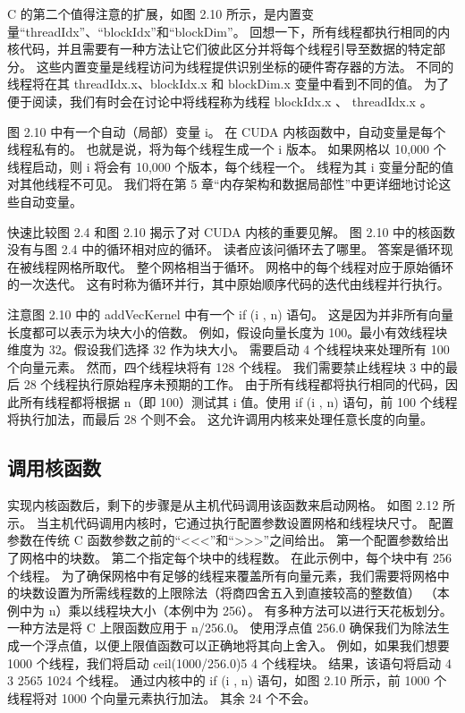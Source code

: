 C 的第二个值得注意的扩展，如图 2.10 所示，是内置变量“threadIdx”、“blockIdx”和“blockDim”。 回想一下，所有线程都执行相同的内核代码，并且需要有一种方法让它们彼此区分并将每个线程引导至数据的特定部分。 这些内置变量是线程访问为线程提供识别坐标的硬件寄存器的方法。 不同的线程将在其 threadIdx.x、blockIdx.x 和 blockDim.x 变量中看到不同的值。 为了便于阅读，我们有时会在讨论中将线程称为线程 blockIdx.x 、 threadIdx.x 。

图 2.10 中有一个自动（局部）变量 i。 在 CUDA 内核函数中，自动变量是每个线程私有的。 也就是说，将为每个线程生成一个 i 版本。 如果网格以 10,000 个线程启动，则 i 将会有 10,000 个版本，每个线程一个。 线程为其 i 变量分配的值对其他线程不可见。 我们将在第 5 章“内存架构和数据局部性”中更详细地讨论这些自动变量。

快速比较图 2.4 和图 2.10 揭示了对 CUDA 内核的重要见解。 图 2.10 中的核函数没有与图 2.4 中的循环相对应的循环。 读者应该问循环去了哪里。 答案是循环现在被线程网格所取代。 整个网格相当于循环。 网格中的每个线程对应于原始循环的一次迭代。 这有时称为循环并行，其中原始顺序代码的迭代由线程并行执行。

注意图 2.10 中的 addVecKernel 中有一个 if (i , n) 语句。 这是因为并非所有向量长度都可以表示为块大小的倍数。 例如，假设向量长度为 100。最小有效线程块维度为 32。假设我们选择 32 作为块大小。 需要启动 4 个线程块来处理所有 100 个向量元素。 然而，四个线程块将有 128 个线程。 我们需要禁止线程块 3 中的最后 28 个线程执行原始程序未预期的工作。 由于所有线程都将执行相同的代码，因此所有线程都将根据 n（即 100）测试其 i 值。使用 if (i , n) 语句，前 100 个线程将执行加法，而最后 28 个则不会。 这允许调用内核来处理任意长度的向量。

\subsection{调用核函数}
实现内核函数后，剩下的步骤是从主机代码调用该函数来启动网格。 如图 2.12 所示。 当主机代码调用内核时，它通过执行配置参数设置网格和线程块尺寸。 配置参数在传统 C 函数参数之前的“<<<”和“>>>”之间给出。 第一个配置参数给出了网格中的块数。 第二个指定每个块中的线程数。 在此示例中，每个块中有 256 个线程。 为了确保网格中有足够的线程来覆盖所有向量元素，我们需要将网格中的块数设置为所需线程数的上限除法（将商四舍五入到直接较高的整数值） （本例中为 n）乘以线程块大小（本例中为 256）。 有多种方法可以进行天花板划分。 一种方法是将 C 上限函数应用于 n/256.0。 使用浮点值 256.0 确保我们为除法生成一个浮点值，以便上限值函数可以正确地将其向上舍入。 例如，如果我们想要 1000 个线程，我们将启动 ceil(1000/256.0)5 4 个线程块。 结果，该语句将启动 4 3 2565 1024 个线程。 通过内核中的 if (i , n) 语句，如图 2.10 所示，前 1000 个线程将对 1000 个向量元素执行加法。 其余 24 个不会。

